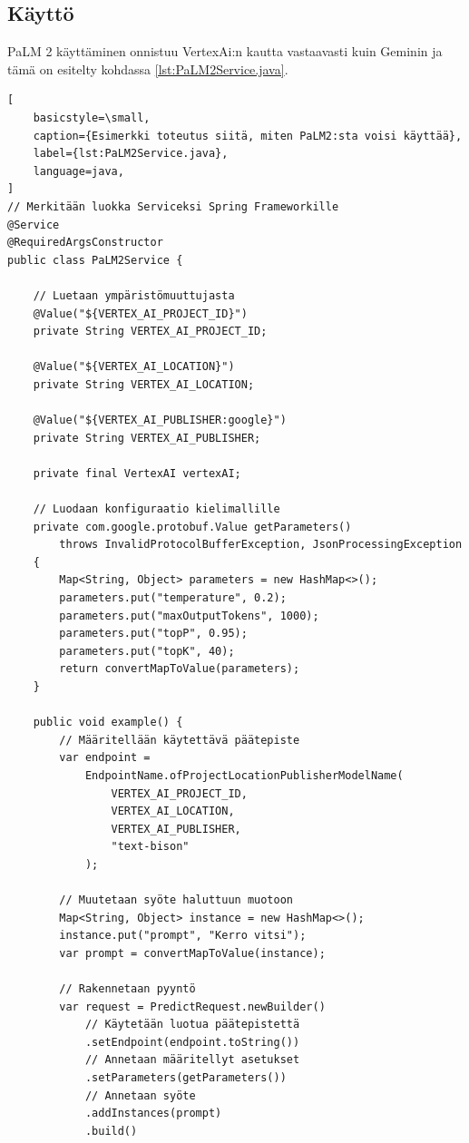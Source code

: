 \subsection{Käyttö}

PaLM 2 käyttäminen onnistuu VertexAi:n kautta vastaavasti kuin Geminin ja
tämä on esitelty kohdassa \ref{lst:PaLM2Service.java}.

\begin{lstlisting}[
    basicstyle=\small,
    caption={Esimerkki toteutus siitä, miten PaLM2:sta voisi käyttää},
    label={lst:PaLM2Service.java},
    language=java,
]
// Merkitään luokka Serviceksi Spring Frameworkille
@Service
@RequiredArgsConstructor
public class PaLM2Service {

    // Luetaan ympäristömuuttujasta
    @Value("${VERTEX_AI_PROJECT_ID}")
    private String VERTEX_AI_PROJECT_ID;

    @Value("${VERTEX_AI_LOCATION}")
    private String VERTEX_AI_LOCATION;

    @Value("${VERTEX_AI_PUBLISHER:google}")
    private String VERTEX_AI_PUBLISHER;

    private final VertexAI vertexAI;

    // Luodaan konfiguraatio kielimallille
    private com.google.protobuf.Value getParameters()
        throws InvalidProtocolBufferException, JsonProcessingException
    {
        Map<String, Object> parameters = new HashMap<>();
        parameters.put("temperature", 0.2);
        parameters.put("maxOutputTokens", 1000);
        parameters.put("topP", 0.95);
        parameters.put("topK", 40);
        return convertMapToValue(parameters);
    }

    public void example() {
        // Määritellään käytettävä päätepiste
        var endpoint =
            EndpointName.ofProjectLocationPublisherModelName(
                VERTEX_AI_PROJECT_ID,
                VERTEX_AI_LOCATION,
                VERTEX_AI_PUBLISHER,
                "text-bison"
            );

        // Muutetaan syöte haluttuun muotoon
        Map<String, Object> instance = new HashMap<>();
        instance.put("prompt", "Kerro vitsi");
        var prompt = convertMapToValue(instance);

        // Rakennetaan pyyntö
        var request = PredictRequest.newBuilder()
            // Käytetään luotua päätepistettä
            .setEndpoint(endpoint.toString())
            // Annetaan määritellyt asetukset
            .setParameters(getParameters())
            // Annetaan syöte
            .addInstances(prompt)
            .build()


\end{lstlisting}

